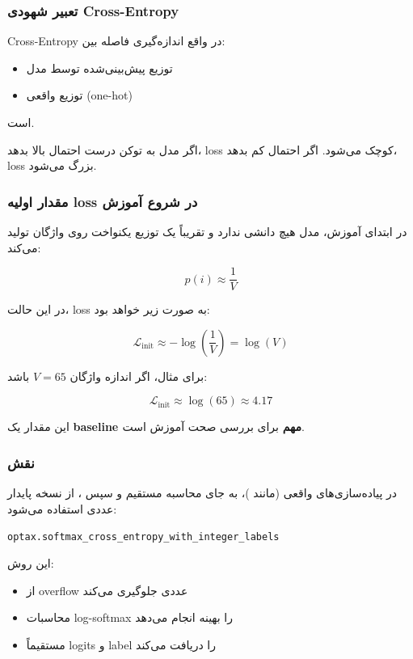 \documentclass{article}
\begin{document}
\subsubsection*{تعبیر شهودی Cross-Entropy}

Cross-Entropy در واقع اندازه‌گیری فاصله بین:

\begin{itemize}
	\item توزیع پیش‌بینی‌شده توسط مدل
	\item توزیع واقعی (one-hot)
\end{itemize}

است.

اگر مدل به توکن درست احتمال بالا بدهد، loss کوچک می‌شود. اگر احتمال کم بدهد، loss بزرگ می‌شود.

\subsubsection*{مقدار اولیه loss در شروع آموزش}

در ابتدای آموزش، مدل هیچ دانشی ندارد و تقریباً یک توزیع یکنواخت روی واژگان تولید می‌کند:

\[
p(i) \approx \frac{1}{V}
\]

در این حالت، loss به صورت زیر خواهد بود:

\[
\mathcal{L}_{\text{init}} \approx -\log\left(\frac{1}{V}\right) = \log(V)
\]

برای مثال، اگر اندازه واژگان \( V = 65 \) باشد:

\[
\mathcal{L}_{\text{init}} \approx \log(65) \approx 4.17
\]

این مقدار یک \textbf{baseline مهم} برای بررسی صحت آموزش است.

\subsubsection*{نقش }

در پیاده‌سازی‌های واقعی (مانند )، به جای محاسبه مستقیم  و سپس ، از نسخه پایدار عددی استفاده می‌شود:

\begin{latin}
	\texttt{optax.softmax\_cross\_entropy\_with\_integer\_labels}
\end{latin}

این روش:

\begin{itemize}
	\item از overflow عددی جلوگیری می‌کند
	\item محاسبات log-softmax را بهینه انجام می‌دهد
	\item مستقیماً logits و label را دریافت می‌کند
\end{itemize}
\end{document}
